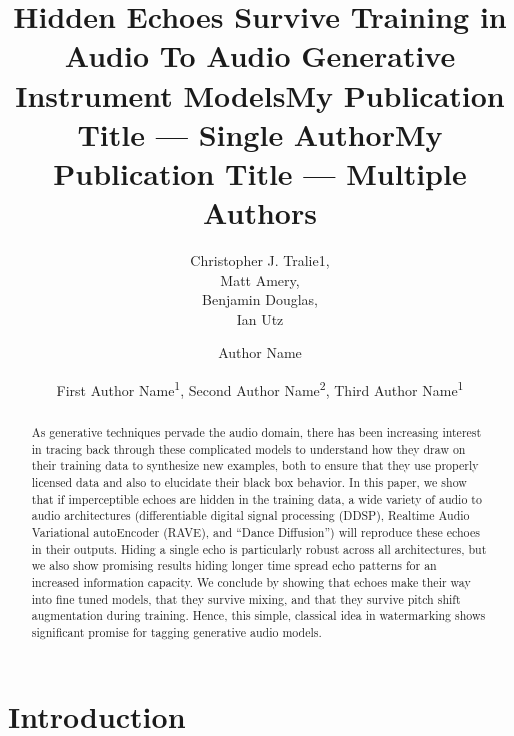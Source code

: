 \documentclass[letterpaper]{article} %
\title{Hidden Echoes Survive Training in Audio To Audio Generative Instrument Models}
\author{
    Christopher J. Tralie{\rm 1},\\
    Matt Amery,\\
    Benjamin Douglas,\\
    Ian Utz
}
\title{My Publication Title --- Single Author}
\author {
    Author Name
}
\title{My Publication Title --- Multiple Authors}
\author {
    First Author Name\textsuperscript{\rm 1},
    Second Author Name\textsuperscript{\rm 2},
    Third Author Name\textsuperscript{\rm 1}
}
\begin{document}
\maketitle

\begin{abstract}
As generative techniques pervade the audio domain, there has been increasing interest in tracing back through these complicated models to understand how they draw on their training data to synthesize new examples, both to ensure that they use properly licensed data and also to elucidate their black box behavior. In this paper, we show that if imperceptible echoes are hidden in the training data, a wide variety of audio to audio architectures (differentiable digital signal processing (DDSP), Realtime Audio Variational autoEncoder (RAVE), and ``Dance Diffusion'') will reproduce these echoes in their outputs. Hiding a single echo is particularly robust across all architectures, but we also show promising results hiding longer time spread echo patterns for an increased information capacity. We conclude by showing that echoes make their way into fine tuned models, that they survive mixing, and that they survive pitch shift augmentation during training. Hence, this simple, classical idea in watermarking shows significant promise for tagging generative audio models. 

\end{abstract}

%

\section{Introduction}
\end{document}
